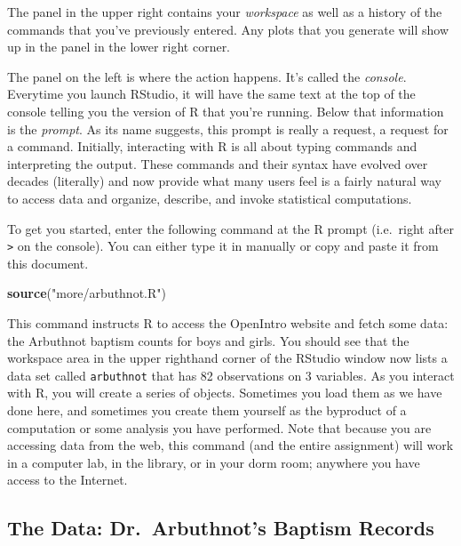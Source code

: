 \documentclass[
]{article}
\newenvironment{Shaded}{\begin{snugshade}}{\end{snugshade}}
\newcommand{\KeywordTok}[1]{\textcolor[rgb]{0.13,0.29,0.53}{\textbf{#1}}}
\newcommand{\NormalTok}[1]{#1}
\newcommand{\StringTok}[1]{\textcolor[rgb]{0.31,0.60,0.02}{#1}}
\begin{document}
The panel in the upper right contains your \emph{workspace} as well as a
history of the commands that you've previously entered. Any plots that
you generate will show up in the panel in the lower right corner.

The panel on the left is where the action happens. It's called the
\emph{console}. Everytime you launch RStudio, it will have the same text
at the top of the console telling you the version of R that you're
running. Below that information is the \emph{prompt}. As its name
suggests, this prompt is really a request, a request for a command.
Initially, interacting with R is all about typing commands and
interpreting the output. These commands and their syntax have evolved
over decades (literally) and now provide what many users feel is a
fairly natural way to access data and organize, describe, and invoke
statistical computations.

To get you started, enter the following command at the R prompt
(i.e.~right after \texttt{\textgreater{}} on the console). You can
either type it in manually or copy and paste it from this document.

\begin{Shaded}
\begin{Highlighting}[]
\KeywordTok{source}\NormalTok{(}\StringTok{"more/arbuthnot.R"}\NormalTok{)}
\end{Highlighting}
\end{Shaded}

This command instructs R to access the OpenIntro website and fetch some
data: the Arbuthnot baptism counts for boys and girls. You should see
that the workspace area in the upper righthand corner of the RStudio
window now lists a data set called \texttt{arbuthnot} that has 82
observations on 3 variables. As you interact with R, you will create a
series of objects. Sometimes you load them as we have done here, and
sometimes you create them yourself as the byproduct of a computation or
some analysis you have performed. Note that because you are accessing
data from the web, this command (and the entire assignment) will work in
a computer lab, in the library, or in your dorm room; anywhere you have
access to the Internet.

\hypertarget{the-data-dr.-arbuthnots-baptism-records}{%
\subsection{The Data: Dr.~Arbuthnot's Baptism
Records}\label{the-data-dr.-arbuthnots-baptism-records}}
\end{document}

